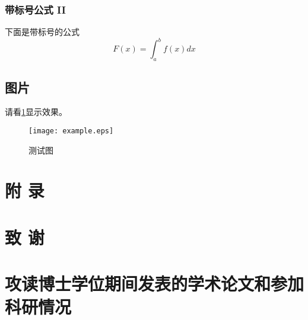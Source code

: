 \documentclass[twoside]{nwpu}
\begin{document}
            \subsection{带标号公式 II}
                下面是带标号的公式
                \begin{equation}
                    F(x) = \int_a^b f(x) dx
                \end{equation}

        \section{图片}
            请看\ref{figOne}显示效果。
            \begin{figure}
              \centering
              \texttt{[image: example.eps]}\\  %
              \caption{测试图}\label{figOne}
            \end{figure}



    \backmatter


    \chapter{附 \quad 录}


    \chapter{致 \quad 谢}

    \chapter{攻读博士学位期间发表的学术论文和参加科研情况}

    \statement  %
\end{document}
